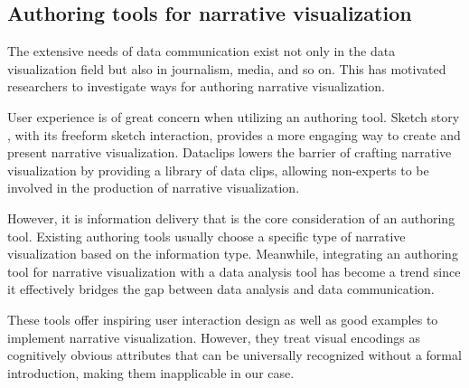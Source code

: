 \subsection{Authoring tools for narrative visualization}
The extensive needs of data communication exist not only in the data visualization field but also in journalism, media, and so on. This has motivated researchers to investigate ways for authoring narrative visualization. \par
User experience is of great concern when utilizing an authoring tool. Sketch story \cite{lee_sketchstory:_2013}, with its freeform sketch interaction, provides a more engaging way to create and present narrative visualization. Dataclips \cite{amini_authoring_2017}lowers the barrier of crafting narrative visualization by providing a library of data clips, allowing non-experts to be involved in the production of narrative visualization. \par
However, it is information delivery that is the core consideration of an authoring tool. Existing authoring tools usually choose a specific type of narrative visualization based on the information type. \cite{amini_authoring_2017, fulda_timelinecurator:_2016}Meanwhile, integrating an authoring tool for narrative visualization with a  data analysis tool has become a trend since it effectively bridges the gap between data analysis and data communication. \cite{eccles_stories_2007,bryan_temporal_2016,lee_more_2015}\par 
These tools offer inspiring user interaction design as well as good examples to implement narrative visualization. However, they treat visual encodings as cognitively obvious attributes that can be universally recognized without a formal introduction, making them inapplicable in our case. \par
